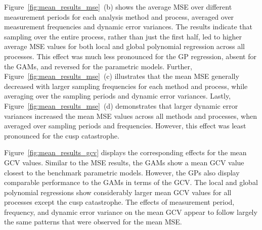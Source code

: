 \documentclass[man, floatsintext]{apa7}
\begin{document}
\begin{sidewaysfigure*}[htbp]
  \caption{Mean MSE effects across all processes, analysis
    methods, and simulation conditions}
  \label{fig:mean_results_mse}
\end{sidewaysfigure*}

Figure~\ref{fig:mean_results_mse}~(b) shows the average MSE over different
measurement periods for each analysis method and process, averaged over
measurement frequencies and dynamic error variances. The results indicate that
sampling over the entire process, rather than just the first half, led to
higher average MSE values for both local and global polynomial regression
across all processes. This effect was much less pronounced for the GP
regression, absent for the GAMs, and reversed for the parametric models.
Further, Figure~\ref{fig:mean_results_mse}~(c) illustrates that the mean MSE
generally decreased with larger sampling frequencies for each method and
process, while averaging over the sampling periods and dynamic error variances.
Lastly, Figure~\ref{fig:mean_results_mse}~(d) demonstrates that larger dynamic
error variances increased the mean MSE values across all methods and processes,
when averaged over sampling periods and frequencies. However, this effect was
least pronounced for the cusp catastrophe.

Figure~\ref{fig:mean_results_gcv} displays the corresponding effects for the
mean GCV values. Similar to the MSE results, the GAMs show a mean GCV value
closest to the benchmark parametric models. However, the GPs also display
comparable performance to the GAMs in terms of the GCV\@. The local and
global polynomial regressions show considerably larger mean GCV values for
all processes except the cusp catastrophe. The effects of
measurement period, frequency, and dynamic error variance on the mean GCV
appear to follow largely the same patterns that were observed for the mean
MSE\@.

\begin{sidewaysfigure*}[htbp]
  \caption{Mean GCV effects across all processes, analysis
    methods, and simulation conditions}
  \label{fig:mean_results_gcv}
\end{sidewaysfigure*}
\end{document}
